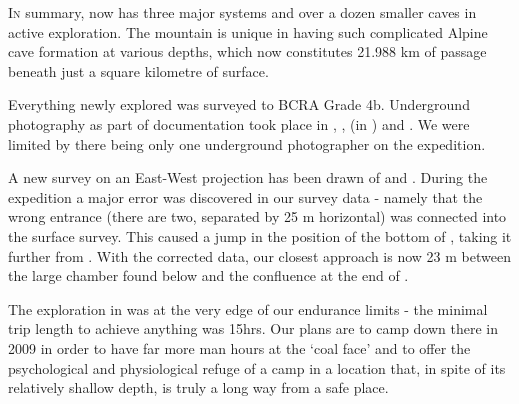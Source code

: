 \thispagestyle{endchapter}

\begin{tcolorbox}

\vspace{80pt}
	\lettrine{I}{n} summary,  now has three major systems and over a dozen smaller caves in active exploration. The mountain is unique in having such complicated Alpine cave formation at various depths, which now constitutes 21.988 km of passage beneath just a square kilometre of surface.

Everything newly explored was surveyed to BCRA Grade 4b. Underground
photography as part of documentation took place in , ,  (in ) and . We were limited by
there being only one underground photographer on the expedition.

A new survey on an East-West projection has been drawn of  and . During the expedition a major error was discovered in our survey data - namely that the wrong  entrance (there are two, separated by 25 m horizontal) was connected into the surface survey. This caused a jump in the position of the bottom of , taking it further from . With the corrected data, our closest approach is now 23 m between the large chamber found below  and the confluence at the end of .

The exploration in  was at the very edge of our endurance limits - the minimal trip length to achieve anything was 15hrs. Our plans are to camp down there in 2009 in order to have far more man hours at the `coal face' and to offer the psychological and physiological refuge of a camp in a location that, in spite of its relatively shallow depth, is truly a long way from a safe place.
 




\end{tcolorbox} 
